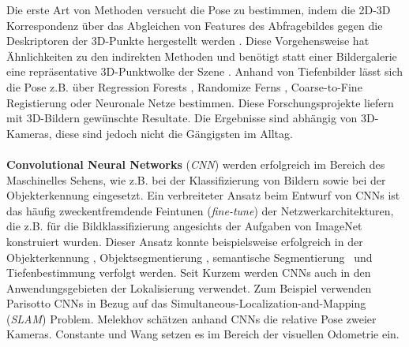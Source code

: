 Die erste Art von Methoden versucht die Pose zu bestimmen, indem die 2D-3D Korrespondenz über das Abgleichen von Features des Abfragebildes gegen die Deskriptoren der 3D-Punkte hergestellt werden \cite{irscharaStructurefrommotionPointClouds2009, liWorldwidePoseEstimation2012, svarmCityScaleLocalizationCameras2017}. Diese Vorgehensweise hat Ähnlichkeiten zu den indirekten Methoden und benötigt statt einer Bildergalerie eine repräsentative 3D-Punktwolke der Szene \cite{piascoSurveyVisualBasedLocalization2018}. Anhand von Tiefenbilder lässt sich die Pose z.B. über Regression Forests \cite{shottonSceneCoordinateRegression2013a}, Randomize Ferns \cite{glockerRealTimeRGBDCamera2015}, Coarse-to-Fine Registierung \cite{santosMappingIndoorSpaces2016} oder Neuronale Netze \cite{massicetiRandomForestsNeural2016} bestimmen. Diese Forschungsprojekte liefern mit 3D-Bildern gewünschte Resultate. Die Ergebnisse sind abhängig von 3D-Kameras, diese sind jedoch nicht die Gängigsten im Alltag.
\\\\
\textbf{Convolutional Neural Networks} (\textit{CNN}) werden erfolgreich im Bereich des Maschinelles Sehens, wie z.B. bei der Klassifizierung von Bildern \cite{krizhevskyImageNetClassificationDeep2012, simonyanVeryDeepConvolutional2014, heDeepResidualLearning2015} sowie bei der Objekterkennung \cite{girshickRichFeatureHierarchies2013, renFasterRCNNRealTime2015b, girshickFastRCNN2015} eingesetzt. 
Ein verbreiteter Ansatz beim Entwurf von CNNs ist das häufig zweckentfremdende Feintunen (\textit{fine-tune}) der Netzwerkarchitekturen, die z.B. für die Bildklassifizierung angesichts der Aufgaben von ImageNet \cite{russakovskyImageNetLargeScale2014} konstruiert wurden. Dieser Ansatz konnte beispielsweise erfolgreich in der Objekterkennung \cite{girshickFastRCNN2015}, Objektsegmentierung \cite{kokkinosPushingBoundariesBoundary2015, maninisConvolutionalOrientedBoundaries2016}, semantische Segmentierung \cite{nohLearningDeconvolutionNetwork2015, hazirbasFuseNetIncorporatingDepth2017a} und Tiefenbestimmung \cite{liDepthSurfaceNormal2015} verfolgt werden.
Seit Kurzem werden CNNs auch in den Anwendungsgebieten der Lokalisierung verwendet. Zum Beispiel verwenden Parisotto \etal\cite{parisottoGlobalPoseEstimation2018} CNNs in Bezug auf das Simultaneous-Localization-and-Mapping (\textit{SLAM}) Problem. Melekhov \etal\cite{melekhovRelativeCameraPose2017} schätzen anhand CNNs die relative Pose zweier Kameras. Constante \etal\cite{costanteExploringRepresentationLearning2016} und Wang \etal\cite{wangDeepVOEndtoendVisual2017} setzen es im Bereich der visuellen Odometrie ein.

